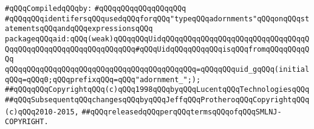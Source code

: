 \label{src/lib/c-kit/src/ast/aid.pkg}
\newline
\verb|#qQQqCompiledqQQqby:|\newline
\verb|#qQQqqQQqqQQqqQQqqQQq|\newline
\newline
\verb|#qQQqqQQqidentifersqQQqusedqQQqforqQQq"typeqQQqadornments"qQQqonqQQqstatementsqQQqandqQQqexpressionsqQQq|\newline
\newline
\verb|packageqQQqaid:qQQq(weak)qQQqqQQqUidqQQqqQQqqQQqqQQqqQQqqQQqqQQqqQQqqQQqqQQqqQQqqQQqqQQqqQQqqQQqqQQq#qQQqUidqQQqqQQqqQQqisqQQqfromqQQqqQQqqQQq|\newline
\verb|qQQqqQQqqQQqqQQqqQQqqQQqqQQqqQQqqQQqqQQqqQQq=qQQqqQQquid_gqQQq(initialqQQq=qQQq0;qQQqprefixqQQq=qQQq"adornment_";);|\newline
\newline
\newline
\newline
\verb|##qQQqqQQqCopyrightqQQq(c)qQQq1998qQQqbyqQQqLucentqQQqTechnologiesqQQq|\newline
\verb|##qQQqSubsequentqQQqchangesqQQqbyqQQqJeffqQQqProtheroqQQqCopyrightqQQq(c)qQQq2010-2015,|\newline
\verb|##qQQqreleasedqQQqperqQQqtermsqQQqofqQQqSMLNJ-COPYRIGHT.|\newline

